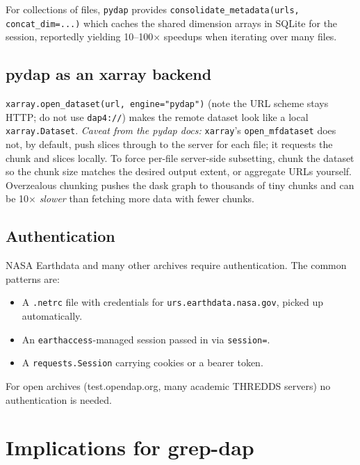 \documentclass[11pt]{article}
\begin{document}
For collections of files, \texttt{pydap} provides
\texttt{consolidate\_metadata(urls, concat\_dim=...)} which caches the
shared dimension arrays in SQLite for the session, reportedly
yielding 10--100$\times$ speedups when iterating over many files.

\subsection{pydap as an xarray backend}

\texttt{xarray.open\_dataset(url, engine="pydap")} (note the URL
scheme stays HTTP; do not use \texttt{dap4://}) makes the remote
dataset look like a local \texttt{xarray.Dataset}. \emph{Caveat from
the pydap docs:} \texttt{xarray}'s
\texttt{open\_mfdataset} does not, by default, push slices through to
the server for each file; it requests the chunk and slices locally.
To force per-file server-side subsetting, chunk the dataset so the
chunk size matches the desired output extent, or aggregate URLs
yourself. Overzealous chunking pushes the dask graph to thousands of
tiny chunks and can be 10$\times$ \emph{slower} than fetching more
data with fewer chunks.

\subsection{Authentication}

NASA Earthdata and many other archives require authentication. The
common patterns are:
\begin{itemize}
  \item A \texttt{.netrc} file with credentials for
    \texttt{urs.earthdata.nasa.gov}, picked up automatically.
  \item An \texttt{earthaccess}-managed session passed in via
    \texttt{session=}.
  \item A \texttt{requests.Session} carrying cookies or a bearer
    token.
\end{itemize}
For open archives (test.opendap.org, many academic THREDDS servers)
no authentication is needed.

\section{Implications for grep-dap}
\end{document}
